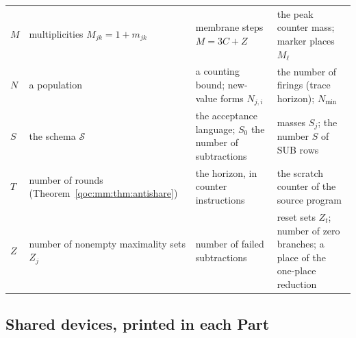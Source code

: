 \documentclass[11pt,letterpaper]{article}
\theoremstyle{definition}
\theoremstyle{remark}
\begin{document}
\begin{longtable}{@{}L{0.07\textwidth}L{0.28\textwidth}L{0.28\textwidth}L{0.28\textwidth}@{}}
$M$ & multiplicities $M_{jk}=1+m_{jk}$ & membrane steps $M=3C+Z$ & the peak counter mass; marker places $M_\ell$ \\
$N$ & a population & a counting bound; new-value forms $N_{j,i}$ & the number of firings (trace horizon); $N_{\min}$ \\
$S$ & the schema $\mathcal S$ & the acceptance language; $S_0$ the number of subtractions & masses $S_j$; the number $S$ of SUB rows \\
$T$ & number of rounds (Theorem~\ref{qoc:mm:thm:antishare}) & the horizon, in counter instructions & the scratch counter of the source program \\
$Z$ & number of nonempty maximality sets $Z_j$ & number of failed subtractions & reset sets $Z_t$; number of zero branches; a place of the one-place reduction \\
\bottomrule
\end{longtable}
\endgroup
\addtocounter{table}{-1}%

\subsection{Shared devices, printed in each Part}\label{qoc:sec:gadgets}
\end{document}
